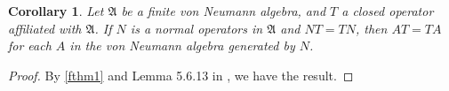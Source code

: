 \documentclass[a4paper,10pt]{amsart}
\newtheorem{theorem}{Theorem}[section]
\newtheorem{corollary}{Corollary}[section]
\newcommand{\AAA}{\mathfrak A}
\newcommand{\C}{\mathbb C} %
\newcommand{\N}{\mathbb N} %
\begin{document}
\begin{comment}
\begin{theorem} 
    Let $\AAA$ be a finite von Neumann algebra with a faithful trace $\tau$,
    and $T$ is a closed operator affiliated with $\AAA$ and $\tau(T^{*}T) < \infty$. 
    If $M$ and $N$ are normal operators in $\AAA$ and $MT = TN$, then
    $M^{*}T = TN^{*}$.
\end{theorem}

\begin{proof} 
    We could assume that $\AAA$ acing on $L^2(\AAA, \tau)$ and $\zeta$ is a
    trace vector. By the fact $\tau(T^{*}T) < \infty$, we have 
    $\| T\zeta \|_2 < \infty$ and $\zeta \in \mathfrak{D}(T)$. By
    Theorem 7.2.15 of \cite{KR}, there exists a * anti-isomorphism $\phi$ of $\AAA$ 
    onto $\AAA'$ such that $A\zeta = \phi(A)\zeta$ for any $A \in \AAA$. 
    Therefore, $\AAA \zeta = \AAA' \zeta \subset \mathfrak{D}(T)$.
    By induction, $MT = TN$ implies that $M^{k}T=TN^{k} $ for all $k \in \N$.
    Thus for any $z \in \C$, for any $A'$ in $\AAA'$, we have
    \begin{align}\label{feq2}
        e^{\Bar{z}M}T = Te^{\Bar{z}N} \mbox{ and }
        e^{\Bar{z}M}T A' \zeta = Te^{\Bar{z}N} A' \zeta. 
    \end{align}
    Let $F(z) = e^{zM^{*}}Te^{-zN^{*}}A' \zeta$. By \cref{feq1},  
    \begin{align*}
        F(z) = A' e^{zM^{*}}e^{-\Bar{z}M}Te^{\Bar{z}N}e^{-zN^{*}}\zeta
             = A' e^{zM^{*}-\Bar{z}M}Te^{\Bar{z}N-zN^{*}}\zeta
             = A' e^{zM^{*}-\Bar{z}M}e^{\Bar{z}\phi(N)-z\phi(N)^{*}}T\zeta.
    \end{align*}
    Note that $e^{zM^{*}-\Bar{z}M}$ is a unitary in $\AAA$ and 
    $\phi(e^{\Bar{z}N-zN^{*}})$ is a unitary in $\AAA'$. Hence 
    $\|F(z)\|_2 \leq \|A'\|\|T\zeta\|_2$ for any $z \in \C$. Since
    $F(z) = e^{zM^{*}}A' e^{-z\phi(N)^{*}}T\zeta$ is analytic, $F(z)$ is 
    constant and equal to $F(0) = T A' \zeta$. Therefore, 
    $0 = F'(z) = M^{*}TA' \zeta - A' \phi(N)^{*}T\zeta = 
    M^{*}TA' \zeta - TN^{*} A'\zeta$ and $M^{*}T = TN^{*}$. 
\end{proof}
\end{comment}

\begin{corollary}\label{fcor1}
    Let $\AAA$ be a finite von Neumann algebra,
    and $T$ a closed operator affiliated with $\AAA$. 
    If $N$ is a normal operators in $\AAA$ and $NT = TN$, then
    $AT = TA$ for each $A$ in the von Neumann algebra generated by $N$.
\end{corollary}
\begin{proof}
    By \cref{fthm1} and Lemma 5.6.13 in \cite{KR}, we have the result.
\end{proof}
\end{document}

